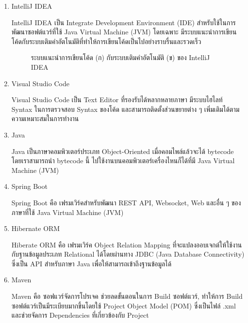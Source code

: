 \begin{enumerate}
	\item IntelliJ IDEA
	
	IntelliJ IDEA เป็น Integrate Development Environment (IDE) สำหรับใช้ในการพัฒนาซอฟต์แวร์ที่ใช้ Java Virtual Machine (JVM) โดยเฉพาะ มีระบบแนะนำการเขียนโค้ดกับระบบเติมคำอัตโนมัติที่ทำให้การเขียนโค้ดเป็นไปอย่างราบรื่นและรวดเร็ว ~\cite{intellij}
	
	\begin{figure}[!h]
		\centering
		\caption{ระบบแนะนำการเขียนโค้ด (ก) กับระบบเติมคำอัตโนมัติ (ข) ของ IntelliJ IDEA}
		\label{Fig:intellij}
	\end{figure}
	
	\item Visual Studio Code
	
	Visual Studio Code เป็น Text Editor ที่รองรับได้หลากหลายภาษา มีระบบไฮไลท์ Syntax ในการตรวจสอบ Syntax ของโค้ด และสามารถติดตั้งส่วนขยายต่าง ๆ เพิ่มเติมได้ตามความเหมาะสมในการทำงาน ~\cite{vscode}
	
	\item Java
	
	Java เป็นภาษาคอมพิวเตอร์ประเภท Object-Oriented เมื่อคอมไพล์แล้วจะได้ bytecode โดยเราสามารถนำ bytecode นี้ ไปใช้งานบนคอมพิวเตอร์เครื่องไหนก็ได้ที่มี Java Virtual Machine (JVM) ~\cite{java}
	
	\item Spring Boot
	
	Spring Boot คือ เฟรมเวิร์คสำหรับพัฒนา REST API, Websocket, Web และอื่น ๆ ของภาษาที่ใช้ Java Virtual Machine (JVM) ~\cite{spring}
	
	\item Hibernate ORM
	
	Hiberate ORM คือ เฟรมเวิร์ค Object Relation Mapping ที่จะแปลงออบเจกต์ให้ใช้งานกับฐานข้อมูลประเภท Relational ได้โดยผ่านทาง JDBC (Java Database Connectivity) ซึ่งเป็น API สำหรับภาษา Java เพื่อให้สามารถเข้าถึงฐานข้อมูลได้ ~\cite{hibernate}

	\item Maven
	
	Maven คือ ซอฟแวร์จัดการโปรเจค ช่วยลดขั้นตอนในการ Build ซอฟต์แวร์, ทำให้การ Build ซอฟต์แวร์เป็นมีระเบียบมากขึ้นโดยใช้ Project Object Model (POM) ซึ่งเป็นไฟล์ .xml และช่วยจัดการ Dependencies ที่เกี่ยวข้องกับ Project ~\cite{maven}
	

\end{enumerate}
